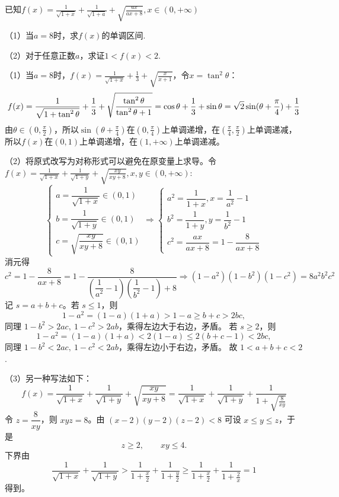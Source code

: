\begin{example}[（2008年江西压轴题）]
    已知$\displaystyle f \left( x \right)= \frac{1}{ \sqrt{1+x}}+ \frac{1}{ \sqrt{1+a}}+ \sqrt{ \frac{ax}{ax+8}},x \in \left( 0,+ \infty \right)$
\vspace{5pt}

    （1）当$a=8$时，求$f(x)$的单调区间.

    （2）对于任意正数$a$，求证$1<f(x)<2$.
\end{example}
\begin{solution}
    （1）当$a=8$时，$\displaystyle f(x)= \frac{1}{ \sqrt{1+x}}+ \frac{1}{3}+ \sqrt{ \frac{x}{x+1}}$，令$x=\tan^2\theta$：
    \[f(x)=\frac{1}{ \sqrt{1+\tan^2\theta}}+ \frac{1}{3}+ \sqrt{ \frac{\tan^2\theta}{\tan^2\theta+1}}\\=\cos \theta+ \frac{1}{3}+ \sin \theta\\=\sqrt{2}\sin(\theta+\frac{\pi}{4})+\frac13\]
    由$\theta\in(0,\frac{\pi}{2})$，所以$\sin(\theta+\frac{\pi}{4})$在$(0,\frac{\pi}{4})$上单调递增，在$(\frac{\pi}{4},\frac{\pi}{2})$上单调递减，所以$f(x)$在$(0,1)$上单调递增，在$(1,+\infty)$上单调递减。

    （2）将原式改写为对称形式可以避免在原变量上求导。令$f \left( x \right)= \frac{1}{ \sqrt{1+x}}+ \frac{1}{ \sqrt{1+y}}+ \sqrt{ \frac{xy}{xy+8}},x,y \in \left( 0,+ \infty \right)$:
    \[
    \begin{cases}a=\dfrac{1}{\sqrt{1+x}}\in(0,1)\\b=\dfrac{1}{ \sqrt{1+y}}\in(0,1)\\c=\sqrt{ \dfrac{xy}{xy+8}}\in(0,1)\end{cases}\Rightarrow 
    \begin{cases}a^2=\dfrac{1}{1+x},x=\dfrac{1}{a^2}-1\\[1.2ex]b^2=\dfrac{1}{1+y},y=\dfrac{1}{b^2}-1\\[1.2ex]c^2=\dfrac{ax}{ax+8}=1-\dfrac{8}{ax+8}\end{cases}
    \]
消元得
\[
c^2=1-\dfrac{8}{ax+8}=1-\dfrac{8}{(\dfrac{1}{a^2}-1)(\dfrac{1}{b^2}-1)+8}\Rightarrow (1-a^2)(1-b^2)(1-c^2)=8a^2b^2c^2
\]
记 \(s=a+b+c\)。若 \(s\le 1\)，则
\[
1-a^2=(1-a)(1+a)>1-a\ge b+c>2bc,
\]
同理 \(1-b^2>2ac,\ 1-c^2>2ab\)，乘得左边大于右边，矛盾。
若 \(s\ge 2\)，则
\[
1-a^2=(1-a)(1+a)<2(1-a)\le 2(b+c-1)<2bc,
\]
同理 \(1-b^2<2ac,\ 1-c^2<2ab\)，乘得左边小于右边，矛盾。
故 \(1<a+b+c<2\).

\noindent（3）另一种写法如下：
\[f \left( x \right)= \frac{1}{ \sqrt{1+x}}+ \frac{1}{ \sqrt{1+y}}+ \sqrt{ \frac{xy}{xy+8}}=\frac{1}{ \sqrt{1+x}}+ \frac{1}{\sqrt{1+y}}+ \frac{1}{1+\sqrt{\frac{8}{xy}}}\]
令 $z=\dfrac{8}{xy}$，则 $xyz=8$。由 $(x-2)(y-2)(z-2)<8$ 可设 $x\le y\le z$，于是
\[
z\ge2,\qquad xy\le4.
\]
下界由
\[
\frac{1}{\sqrt{1+x}}+\frac{1}{\sqrt{1+y}}>
\frac{1}{1+\frac{x}{2}}+\frac{1}{1+\frac{y}{2}}
\ge
\frac{1}{1+\frac{x}{2}}+\frac{1}{1+\frac{2}{x}}
=1
\]
得到。


\end{solution}
